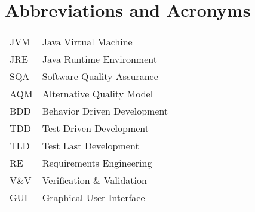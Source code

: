 \chapter*{Abbreviations and Acronyms}


\noindent
\begin{longtable}{@{}p{}p{}@{}}
JVM & Java Virtual Machine \\
JRE & Java Runtime Environment \\
SQA & Software Quality Assurance \\
AQM & Alternative Quality Model \\
BDD & Behavior Driven Development \\
TDD & Test Driven Development \\
TLD & Test Last Development \\
RE & Requirements Engineering \\
V\&V & Verification \& Validation \\
GUI & Graphical User Interface \\
\end{longtable}
